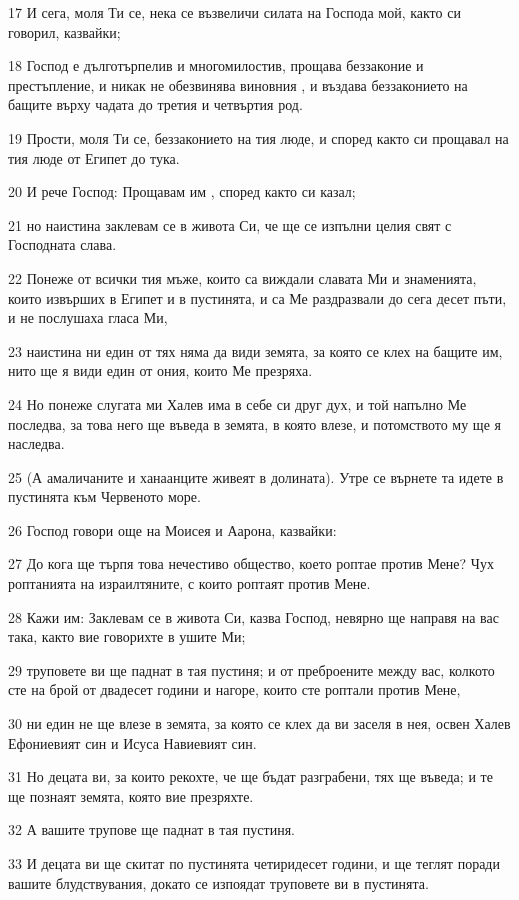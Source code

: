 \par 17 И сега, моля Ти се, нека се възвеличи силата на Господа мой, както си говорил, казвайки;
\par 18 Господ е дълготърпелив и многомилостив, прощава беззаконие и престъпление, и никак не обезвинява виновния , и въздава беззаконието на бащите върху чадата до третия и четвъртия род.
\par 19 Прости, моля Ти се, беззаконието на тия люде, и според както си прощавал на тия люде от Египет до тука.
\par 20 И рече Господ: Прощавам им , според както си казал;
\par 21 но наистина заклевам се в живота Си, че ще се изпълни целия свят с Господната слава.
\par 22 Понеже от всички тия мъже, които са виждали славата Ми и знаменията, които извърших в Египет и в пустинята, и са Ме раздразвали до сега десет пъти, и не послушаха гласа Ми,
\par 23 наистина ни един от тях няма да види земята, за която се клех на бащите им, нито ще я види един от ония, които Ме презряха.
\par 24 Но понеже слугата ми Халев има в себе си друг дух, и той напълно Ме последва, за това него ще въведа в земята, в която влезе, и потомството му ще я наследва.
\par 25 (А амаличаните и ханаанците живеят в долината). Утре се върнете та идете в пустинята към Червеното море.
\par 26 Господ говори още на Моисея и Аарона, казвайки:
\par 27 До кога ще търпя това нечестиво общество, което роптае против Мене? Чух роптанията на израилтяните, с които роптаят против Мене.
\par 28 Кажи им: Заклевам се в живота Си, казва Господ, невярно ще направя на вас така, както вие говорихте в ушите Ми;
\par 29 труповете ви ще паднат в тая пустиня; и от преброените между вас, колкото сте на брой от двадесет години и нагоре, които сте роптали против Мене,
\par 30 ни един не ще влезе в земята, за която се клех да ви заселя в нея, освен Халев Ефониевият син и Исуса Навиевият син.
\par 31 Но децата ви, за които рекохте, че ще бъдат разграбени, тях ще въведа; и те ще познаят земята, която вие презряхте.
\par 32 А вашите трупове ще паднат в тая пустиня.
\par 33 И децата ви ще скитат по пустинята четиридесет години, и ще теглят поради вашите блудствувания, докато се изпоядат труповете ви в пустинята.
